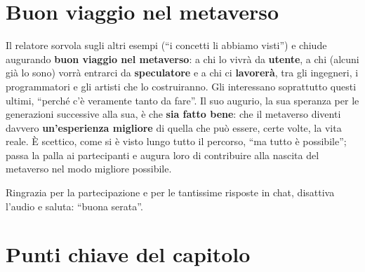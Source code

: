 \section{Buon viaggio nel metaverso}
\label{z8:sec:chiusura}

Il relatore sorvola sugli altri esempi (``i concetti li abbiamo visti'') e chiude
augurando \textbf{buon viaggio nel metaverso}: a chi lo vivrà da
\textbf{utente}, a chi (alcuni già lo sono) vorrà entrarci da
\textbf{speculatore} e a chi ci \textbf{lavorerà}, tra gli ingegneri, i
programmatori e gli artisti che lo costruiranno. Gli interessano soprattutto
questi ultimi, ``perché c'è veramente tanto da fare''. Il suo augurio, la sua
speranza per le generazioni successive alla sua, è che \textbf{sia fatto bene}:
che il metaverso diventi davvero \textbf{un'esperienza migliore} di quella che
può essere, certe volte, la vita reale. È scettico, come si è visto lungo tutto il
percorso, ``ma tutto è possibile''; passa la palla ai partecipanti e augura loro
di contribuire alla nascita del metaverso nel modo migliore possibile.

Ringrazia per la partecipazione e per le tantissime risposte in chat, disattiva
l'audio e saluta: ``buona serata''.

\section*{Punti chiave del capitolo}

